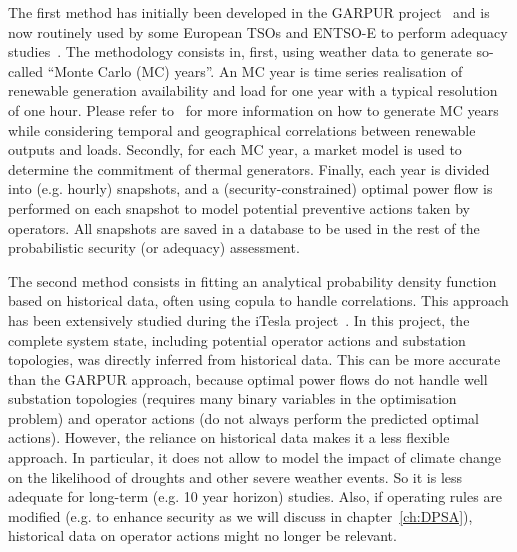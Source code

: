 The first method has initially been developed in the GARPUR project~\cite{StrathElia, StrathGARPUR} and is now routinely used by some European TSOs and ENTSO-E to perform adequacy studies~\cite{ACER_MC_year, EliaAdequacy}. The methodology consists in, first, using weather data to generate so-called ``Monte Carlo (MC) years''. An MC year is time series realisation of renewable generation availability and load for one year with a typical resolution of one hour. Please refer to~\cite{StrathGARPUR} for more information on how to generate MC years while considering temporal and geographical correlations between renewable outputs and loads. Secondly, for each MC year, a market model is used to determine the commitment of thermal generators. Finally, each year is divided into (e.g. hourly) snapshots, and a (security-constrained) optimal power flow is performed on each snapshot to model potential preventive actions taken by operators. All snapshots are saved in a database to be used in the rest of the probabilistic security (or adequacy) assessment. %

The second method consists in fitting an analytical probability density function based on historical data, often using copula to handle correlations. This approach has been extensively studied during the iTesla project~\cite{KonstantelosCopulas, EurostagHPC}. In this project, the complete system state, including potential operator actions and substation topologies, was directly inferred from historical data. This can be more accurate than the GARPUR approach, because optimal power flows do not handle well substation topologies (requires many binary variables in the optimisation problem) and operator actions (do not always perform the predicted optimal actions). However, the reliance on historical data makes it a less flexible approach. In particular, it does not allow to model the impact of climate change on the likelihood of droughts and other severe weather events. So it is less adequate for long-term (e.g. 10 year horizon) studies. Also, if operating rules are modified (e.g. to enhance security as we will discuss in chapter~\ref{ch:DPSA}), historical data on operator actions might no longer be relevant.



